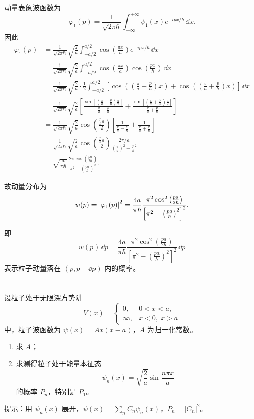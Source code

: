 \documentclass[12pt,a4paper]{article}
\begin{document}
动量表象波函数为
\[
\varphi_1(p)=\frac{1}{\sqrt{2\pi\hbar}}\int_{-\infty}^{+\infty}\psi_1(x)e^{-ipx/\hbar}\, \dd x.
\]
因此
\begin{align*}
  \varphi_1(p)&=\frac{1}{\sqrt{2\pi\hbar}}\sqrt{\frac{2}{a}}\int_{-a/2}^{a/2}\cos\left(\frac{\pi x}{a}\right)e^{-ipx/\hbar}\, \dd x\\
  &=\frac{1}{\sqrt{2\pi\hbar}}\sqrt{\frac{2}{a}}\int_{-a/2}^{a/2}\cos\left(\frac{\pi x}{a}\right)\cos\left(\frac{px}{\hbar}\right)\, \dd x\\
  &=\frac{1}{\sqrt{2\pi\hbar}}\sqrt{\frac{2}{a}}\cdot\frac{1}{2}
  \int_{-a/2}^{a/2}
  \left[
  \cos\left(\left(\frac{\pi}{a}-\frac{p}{\hbar}\right)x\right)
  +\cos\left(\left(\frac{\pi}{a}+\frac{p}{\hbar}\right)x\right)
  \right]\, \dd x \\
  &=\frac{1}{\sqrt{2\pi\hbar}}\sqrt{\frac{2}{a}}
  \left[
  \frac{\sin\left[\left(\frac{\pi}{a}-\frac{p}{\hbar}\right)\frac{a}{2}\right]}{\frac{\pi}{a}-\frac{p}{\hbar}}
  +
  \frac{\sin\left[\left(\frac{\pi}{a}+\frac{p}{\hbar}\right)\frac{a}{2}\right]}{\frac{\pi}{a}+\frac{p}{\hbar}}
  \right] \\
  &=\frac{1}{\sqrt{2\pi\hbar}}\sqrt{\frac{2}{a}}
  \cos\left(\frac{\frac{p}{\hbar}a}{2}\right)
  \left[
  \frac{1}{\frac{\pi}{a}-\frac{p}{\hbar}}
  +
  \frac{1}{\frac{\pi}{a}+\frac{p}{\hbar}}
  \right] \\
  &=\frac{1}{\sqrt{2\pi\hbar}}\sqrt{\frac{2}{a}}
  \cos\left(\frac{\frac{p}{\hbar}a}{2}\right)
  \frac{2\pi/a}{\left(\frac{\pi}{a}\right)^2-\frac{p}{\hbar}^2} \\
  &=\sqrt{\frac{a}{\pi\hbar}}\,
  \frac{2\pi\cos\left(\frac{pa}{2\hbar}\right)}{\pi^2-\left(\frac{pa}{\hbar}\right)^2}.
\end{align*}

故动量分布为
\[
w(p)=\abs{\varphi_1(p)}^2
=\frac{4a}{\pi\hbar}
\frac{\pi^2\cos^2\left(\frac{pa}{2\hbar}\right)}
{\left[\pi^2-\left(\frac{pa}{\hbar}\right)^2\right]^2}.
\]

即
\[
w(p)\, \dd p
=
\frac{4a}{\pi\hbar}
\frac{\pi^2\cos^2\left(\frac{pa}{2\hbar}\right)}
{\left[\pi^2-\left(\frac{pa}{\hbar}\right)^2\right]^2}
\, \dd p
\]
表示粒子动量落在 \((p,p+\dd p)\) 内的概率。

\section{}
设粒子处于无限深方势阱
\[
V(x)=
\begin{cases}
0, & 0<x<a,\\
\infty, & x<0,\ x>a
\end{cases}
\]
中，粒子波函数为 $\psi(x)=Ax(x-a)$，$A$ 为归一化常数。
\begin{enumerate}[label=(\alph*)]
  \item 求 $A$；
  \item 求测得粒子处于能量本征态
  \[
  \psi_n(x)=\sqrt{\frac{2}{a}}\sin\frac{n\pi x}{a}
  \]
  的概率 $P_n$，特别是 $P_1$。
\end{enumerate}
提示：用 $\psi_n(x)$ 展开，$\psi(x)=\sum_n C_n\psi_n(x)$，$P_n=|C_n|^2$。
\end{document}
